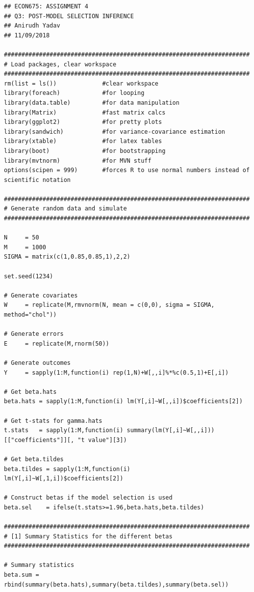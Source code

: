 \documentclass[12pt]{article}
\begin{document}
\begin{verbatim}
## ECON675: ASSIGNMENT 4
## Q3: POST-MODEL SELECTION INFERENCE
## Anirudh Yadav 
## 11/09/2018

######################################################################
# Load packages, clear workspace
######################################################################
rm(list = ls())             #clear workspace
library(foreach)            #for looping
library(data.table)         #for data manipulation
library(Matrix)             #fast matrix calcs
library(ggplot2)            #for pretty plots
library(sandwich)           #for variance-covariance estimation 
library(xtable)             #for latex tables
library(boot)               #for bootstrapping
library(mvtnorm)            #for MVN stuff
options(scipen = 999)       #forces R to use normal numbers instead of scientific notation

######################################################################
# Generate random data and simulate
######################################################################

N     = 50
M     = 1000
SIGMA = matrix(c(1,0.85,0.85,1),2,2)

set.seed(1234)

# Generate covariates
W     = replicate(M,rmvnorm(N, mean = c(0,0), sigma = SIGMA, method="chol"))

# Generate errors
E     = replicate(M,rnorm(50))

# Generate outcomes
Y     = sapply(1:M,function(i) rep(1,N)+W[,,i]%*%c(0.5,1)+E[,i])

# Get beta.hats
beta.hats = sapply(1:M,function(i) lm(Y[,i]~W[,,i])$coefficients[2])

# Get t-stats for gamma.hats
t.stats   = sapply(1:M,function(i) summary(lm(Y[,i]~W[,,i]))[["coefficients"]][, "t value"][3])

# Get beta.tildes
beta.tildes = sapply(1:M,function(i) lm(Y[,i]~W[,1,i])$coefficients[2])

# Construct betas if the model selection is used
beta.sel    = ifelse(t.stats>=1.96,beta.hats,beta.tildes)
  
######################################################################
# [1] Summary Statistics for the different betas
######################################################################

# Summary statistics
beta.sum = rbind(summary(beta.hats),summary(beta.tildes),summary(beta.sel))


\end{verbatim}
\end{document}
